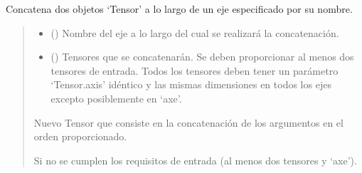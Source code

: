 \documentclass[letterpaper,10pt,english]{sphinxmanual}
\begin{document}

\begin{fulllineitems}
\label{\detokenize{myutils:myutils.tensor.append}}
\pysigstartsignatures
{}
\pysigstopsignatures
\sphinxAtStartPar
Concatena dos objetos ‘Tensor’ a lo largo de un eje especificado por su nombre.
\begin{quote}\begin{description}
\begin{itemize}
\item {} 
\sphinxAtStartPar
{} () \textendash{} Nombre del eje a lo largo del cual se realizará la concatenación.

\item {} 
\sphinxAtStartPar
{} ({\hyperref[\detokenize{myutils:myutils.tensor.Tensor}]{}}) \textendash{} Tensores que se concatenarán. Se deben proporcionar al menos dos tensores de entrada.
Todos los tensores deben tener un parámetro ‘Tensor.axis’ idéntico y las mismas
dimensiones en todos los ejes excepto posiblemente en ‘axe’.

\end{itemize}

\sphinxAtStartPar
Nuevo Tensor que consiste en la concatenación de los argumentos en el orden proporcionado.

\sphinxAtStartPar
{\hyperref[\detokenize{myutils:myutils.tensor.Tensor}]{}}

\sphinxAtStartPar
{} \textendash{} Si no se cumplen los requisitos de entrada (al menos dos tensores y ‘axe’).

\end{description}\end{quote}

\end{fulllineitems}

\end{document}
